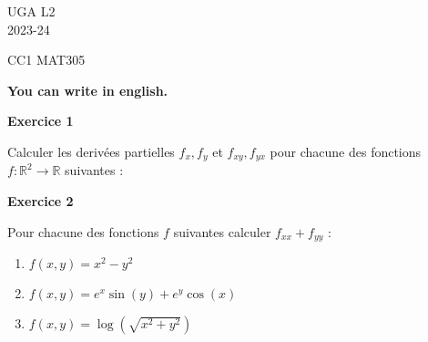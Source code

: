 \documentclass[a4paper,12pt]{article}
\begin{document}
	\noindent UGA \hfill L2\\
	\hfill 2023-24 \\
	\bigskip

	\begin{center}
		\textsc{CC1 MAT305}


{\bf You can write in english.}
		

	\end{center}
	\bigskip
	
\hrulefill
	
\vspace{1cm}

 

\begin{center}
{\large{\bf Exercice 1}}
\end{center}


Calculer les derivées partielles $f_x,f_y$ et $f_{xy}, f_{yx}$ pour
chacune des fonctions\\ 
$f:\mathbb{R}^2 \rightarrow \mathbb{R}$  suivantes :

 




\hrulefill

\vspace{1cm}

\begin{center}
{\large{\bf Exercice 2}}
\end{center}

Pour chacune des fonctions $f$ suivantes calculer $f_{xx} + f_{yy}$
: 

\begin{enumerate}
	\item $f(x,y)=  x^2 - y^2$
	\item $f(x,y) = e^x \sin(y) + e^y \cos(x)$
	\item $f(x,y)=  \log()$
	
\end{enumerate}
\end{document}
